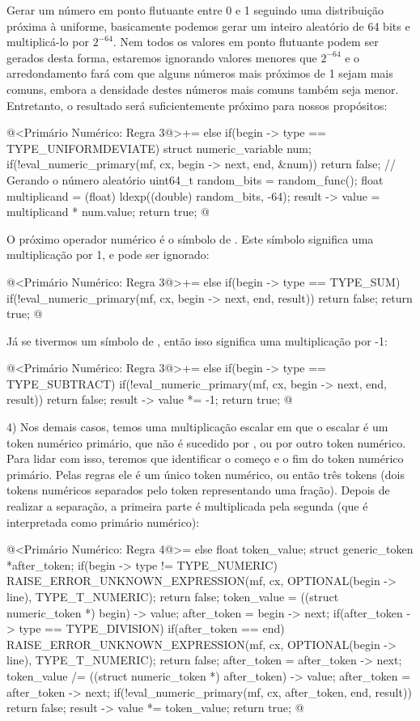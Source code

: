 Gerar um número em ponto flutuante entre 0 e 1 seguindo uma
distribuição próxima à uniforme, basicamente podemos gerar um inteiro
aleatório de 64 bits e multiplicá-lo por $2^{-64}$. Nem todos os valores
em ponto flutuante podem ser gerados desta forma, estaremos ignorando
valores menores que $2^{-64}$ e o arredondamento fará com que alguns
números mais próximos de 1 sejam mais comuns, embora a densidade
destes números mais comuns também seja menor. Entretanto, o resultado
será suficientemente próximo para nossos propósitos:

\iniciocodigo
@<Primário Numérico: Regra 3@>+=
else if(begin -> type == TYPE_UNIFORMDEVIATE){
  struct numeric_variable num;
  if(!eval_numeric_primary(mf, cx, begin -> next, end, &num))
    return false;
  { // Gerando o número aleatório
    uint64_t random_bits = random_func();
    float multiplicand = (float) ldexp((double) random_bits, -64);
    result -> value = multiplicand * num.value;
  }
  return true;
}
@
\fimcodigo

O próximo operador numérico é o símbolo de \monoespaco{+}. Este
símbolo significa uma multiplicação por 1, e pode ser ignorado:

\iniciocodigo
@<Primário Numérico: Regra 3@>+=
else if(begin -> type == TYPE_SUM){
  if(!eval_numeric_primary(mf, cx, begin -> next, end, result))
    return false;
  return true;
}
@
\fimcodigo

Já se tivermos um símbolo de \monoespaco{-}, então isso significa uma
multiplicação por -1:

\iniciocodigo
@<Primário Numérico: Regra 3@>+=
else if(begin -> type == TYPE_SUBTRACT){
  if(!eval_numeric_primary(mf, cx, begin -> next, end, result))
    return false;
  result -> value *= -1;
  return true;
}
@
\fimcodigo


4) Nos demais casos, temos uma multiplicação escalar em que o escalar
é um token numérico primário, que não é sucedido
por \monoespaco{+}, \monoespaco{-} ou por outro token numérico. Para
lidar com isso, teremos que identificar o começo e o fim do token
numérico primário. Pelas regras ele é um único token numérico, ou
então três tokens (dois tokens numéricos separados pelo
token \monoespaco{/} representando uma fração). Depois de realizar a
separação, a primeira parte é multiplicada pela segunda (que é
interpretada como primário numérico):

\iniciocodigo
@<Primário Numérico: Regra 4@>=
else{
  float token_value;
  struct generic_token *after_token;
  if(begin -> type != TYPE_NUMERIC){
    RAISE_ERROR_UNKNOWN_EXPRESSION(mf, cx, OPTIONAL(begin -> line),
                                   TYPE_T_NUMERIC);
    return false;
  }
  token_value = ((struct numeric_token *) begin) -> value;
  after_token = begin -> next;
  if(after_token -> type == TYPE_DIVISION){
    if(after_token == end){
      RAISE_ERROR_UNKNOWN_EXPRESSION(mf, cx, OPTIONAL(begin -> line),
                                     TYPE_T_NUMERIC);
      return false;
    }
    after_token = after_token -> next;
    token_value /= ((struct numeric_token *) after_token) -> value;
    after_token = after_token -> next;
  }
  if(!eval_numeric_primary(mf, cx, after_token, end, result))
    return false;
  result -> value *= token_value;
  return true;
}
@
\fimcodigo

